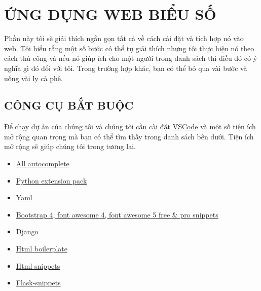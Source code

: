 \documentclass{article}
\begin{document}
\section{ỨNG DỤNG WEB BIỂU SỐ}
Phần này tôi sẽ giải thích ngắn gọn tất cả về cách cài đặt và tích hợp nó vào web. Tôi hiểu rằng một số bước có thể tự giải thích nhưng tôi thực hiện nó theo cách thủ công và nếu nó giúp ích cho một người trong danh sách thì điều đó có ý nghĩa gì đó đối với tôi. Trong trường hợp khác, bạn có thể bỏ qua vài bước và uống vài ly cà phê.
\subsection{CÔNG CỤ BẮT BUỘC}
Để chạy dự án của chúng tôi và chúng tôi cần cài đặt \href{https://code.visualstudio.com/download.}{VSCode} 
và một số tiện ích mở rộng quan trọng mà bạn có thể tìm thấy trong danh sách bên dưới. Tiện ích mở rộng sẽ giúp chúng tôi trong tương lai.
\begin{itemize}
    \item \href{https://marketplace.visualstudio.com/items?itemName=Atishay-Jain.All-Autocomplete.}{All autocomplete}\\
    \item \href{https://marketplace.visualstudio.com/items?itemName=donjayamanne.python-extension-pack.}{Python extension pack}\\
    \item \href{https://marketplace.visualstudio.com/items?itemName=redhat.vscode-yaml.}{Yaml}\\
    \item \href{https://marketplace.visualstudio.com/items?itemName=thekalinga.bootstrap4-vscode.}{Bootstrap 4, font awesome 4, font awesome 5 free & pro snippets}\\
    \item \href{https://marketplace.visualstudio.com/items?itemName=batisteo.vscode-django.}{Django}\\
    \item \href{https://marketplace.visualstudio.com/items?itemName=sidthesloth.html5-boilerplate.}{Html boilerplate}\\
    \item \href{https://marketplace.visualstudio.com/items?itemName=abusaidm.html-snippets.}{Html snippets}
    \item \href{https://marketplace.visualstudio.com/items?itemName=cstrap.flask-snippets.}{Flask-snippets}\\

\end{itemize}
\end{document}
